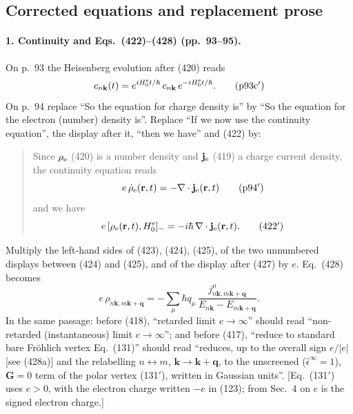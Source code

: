 \documentclass[11pt]{article}
\begin{document}
\subsection{Corrected equations and replacement prose}
\paragraph{1. Continuity and Eqs.~(422)--(428) (pp.~93--95).}
On p.~93 the Heisenberg evolution after (420) reads
\begin{equation*}
c_{n\mathbf k}(t)=e^{iH^{\rm e}_0t/\hbar}\,c_{n\mathbf k}\,e^{-iH^{\rm e}_0t/\hbar}.
\tag{p93c$'$}
\end{equation*}
On p.~94 replace ``So the equation for charge density is'' by ``So the equation for the electron (number)
density is''. Replace ``If we now use the continuity equation'', the display after it, ``then we have''
and (422) by:
\begin{quote}
Since $\rho_{\rm e}$ (420) is a number density and $\mathbf j_{\rm e}$ (419) a charge current density, the
continuity equation reads
\begin{equation*}
e\,\dot\rho_{\rm e}(\mathbf r,t)=-\nabla\cdot\mathbf j_{\rm e}(\mathbf r,t)
\tag{p94$'$}
\end{equation*}
and we have
\begin{equation*}
e\,[\rho_{\rm e}(\mathbf r,t),H^{\rm e}_0]_-=-i\hbar\,\nabla\cdot\mathbf j_{\rm e}(\mathbf r,t).
\tag{422$'$}
\end{equation*}
\end{quote}
Multiply the left-hand sides of (423), (424), (425), of the two unnumbered displays between (424) and
(425), and of the display after (427) by $e$. Eq.~(428) becomes
\begin{equation*}
e\,\rho_{n\mathbf k,m\mathbf k+\mathbf q}=-\sum_\mu\hbar q_\mu\,
\frac{j^\mu_{n\mathbf k,m\mathbf k+\mathbf q}}{E_{n\mathbf k}-E_{m\mathbf k+\mathbf q}} .
\tag{428$'$}
\end{equation*}
In the same passage: before (418), ``retarded limit $c\to\infty$'' should read ``non-retarded
(instantaneous) limit $c\to\infty$''; and before (417), ``reduce to standard bare Fr\"ohlich vertex
Eq.~(131)'' should read ``reduces, up to the overall sign $e/|e|$ [see (428a)] and the relabelling
$n\leftrightarrow m$, $\mathbf k\to\mathbf k+\mathbf q$, to the unscreened ($\hat\epsilon^\infty=1$),
$\mathbf G=0$ term of the polar vertex (131$'$), written in Gaussian units''. [Eq.~(131$'$) uses $e>0$,
with the electron charge written $-e$ in (123); from Sec.~4 on $e$ is the signed electron charge.]
\end{document}
